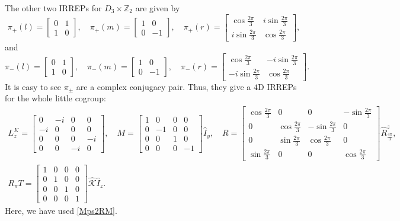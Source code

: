 \documentclass[aps,prl,twocolumn,noshowpacs,superscriptaddress]{revtex4-1}
\def \K {\hat{\mathcal{K}}}
\begin{document}
The other two IRREPs for $D_3\times \mathbb{Z}_2$ are given by
\begin{equation}
	\pi_+(l)=\begin{bmatrix}
		0 & 1\\
		1 & 0
	\end{bmatrix},\quad \pi_+(m)=\begin{bmatrix}
		1 & 0\\ 
		0 & -1
	\end{bmatrix},\quad \pi_{+}(r)=\begin{bmatrix}
		\cos\frac{2\pi}{3} & i\sin \frac{2\pi}{3}\\
		i\sin \frac{2\pi}{3} & \cos\frac{2\pi}{3} 
	\end{bmatrix},
\end{equation}
and 
\begin{equation}
	\pi_-(l)=\begin{bmatrix}
		0 & 1\\
		1 & 0
	\end{bmatrix},\quad \pi_-(m)=\begin{bmatrix}
		1 & 0\\ 
		0 & -1
	\end{bmatrix},\quad \pi_{-}(r)=\begin{bmatrix}
		\cos\frac{2\pi}{3} & -i\sin \frac{2\pi}{3}\\
		-i\sin \frac{2\pi}{3} & \cos\frac{2\pi}{3} 
	\end{bmatrix}.
\end{equation}
It is easy to see $\pi_{\pm}$ are a complex conjugacy pair. Thus, they give a $4$D IRREPs for the whole little cogroup:
\begin{gather}
	L_z^K=\begin{bmatrix}
		0 & -i & 0 & 0\\
		-i & 0 & 0 & 0\\
		0 & 0 & 0 & -i\\
		0 & 0 & -i & 0
	\end{bmatrix},\quad M=\begin{bmatrix}
		1 & 0 & 0 & 0\\
		0 & -1 & 0 & 0\\
		0 & 0 & 1 & 0\\
		0 & 0 & 0 & -1
	\end{bmatrix}\hat{I}_{y},\quad 
	R=\begin{bmatrix}
		\cos\frac{2\pi}{3} & 0 & 0 & -\sin \frac{2\pi}{3}\\
		0 & \cos\frac{2\pi}{3} & -\sin \frac{2\pi}{3} & 0\\
		0 & \sin \frac{2\pi}{3} & \cos\frac{2\pi}{3} & 0\\
		\sin \frac{2\pi}{3} & 0 & 0 & \cos\frac{2\pi}{3}
	\end{bmatrix}\hat{R}^z_{\frac{4\pi}{3}},\nonumber \\
	R_{\pi}T=\begin{bmatrix}
		1 & 0 & 0 & 0\\
		0 & 1 & 0 & 0\\
		0 & 0 & 1 & 0\\
		0 & 0 & 0 & 1
	\end{bmatrix}\K\hat{I}_z.
\end{gather}
Here, we have used \eqref{Mps2RM}.
\end{document}
